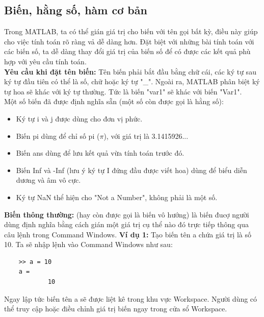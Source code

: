 \documentclass[12pt,a4paper]{article}
\begin{document}
\subsection{Biến, hằng số, hàm cơ bản}
Trong MATLAB, ta có thể gián giá trị cho biến với tên gọi bất kỳ, điều này giúp cho việc tính toán rõ ràng vả dễ dàng hơn. Đặt biệt với những bài tính toán với các biến số, ta dễ dàng thay đổi giá trị của biến số để có được các kết quả phù hợp với yêu cầu tính toán.\\
\textbf{Yêu cầu khi đặt tên biến:} Tên biến phải bắt đầu bằng chữ cái, các ký tự sau ký tự đầu tiên có thể là số, chữ hoặc ký tự "\_". Ngoài ra, MATLAB phân biệt ký tự hoa sẽ khác với ký tự thường. Tức là biến "var1" sẽ khác với biến "Var1".\\
Một số biến đã được định nghĩa sẵn (một số còn được gọi là hằng số):
\begin{itemize}
	\item Ký tự i và j được dùng cho đơn vị phức.
	\item Biến pi dùng để chỉ số pi ($\pi$), với giá trị là 3.1415926...
	\item Biến ans dùng để lưu kết quả vừa tính toán trước đó.
	\item Biến Inf và -Inf (lưu ý ký tự I đứng đầu được viết hoa) dùng để biểu diễn dương và âm vô cực.
	\item Ký tự NaN thể hiện cho "Not a Number", không phải là một số.
\end{itemize}
\textbf{Biến thông thường:} (hay còn được gọi là biến vô hướng) là biến đucợ người dùng định nghĩa bằng cách gián một giá trị cụ thể nào đó trực tiếp thông qua câu lệnh trong Command Windows.
\textbf{Ví dụ 1:} Tạo biến tên a chứa giá trị là số 10. Ta sẽ nhập lệnh vào Command Windows như sau:
\begin{lstlisting}
	>> a = 10
	a =
    		10
\end{lstlisting}
Ngay lập tức biến tên a sẽ được liệt kê trong khu vực Workspace. Người dùng có thể truy cập hoặc điều chỉnh giá trị biến ngay trong cửa sổ Workspace.\\
\end{document}
